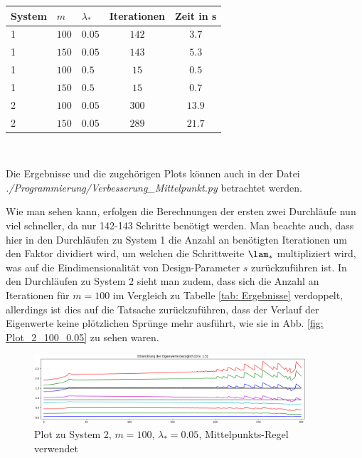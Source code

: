 \documentclass[a4paper,12pt]{report}
\newcommand{\1}{\mathds{1}}
\theoremstyle{plain} %
\theoremstyle{definition} %
\theoremstyle{remark}
\begin{document}
            \begin{table}[!ht]
                  \centering
                  \begin{tabular}{lllcc}
                       System & $m$ & $\lambda_*$ & Iterationen & Zeit in s\\
                       \hline
                       1 & $100$ & $0.05$ & $142$ & $3.7$ \\ 
                       1 & $150$ & $0.05$ & $143$ & $5.3$ \\
                       \hline
                       1 & $100$ & $0.5$ & $15$ & $0.5$ \\
                       1 & $150$ & $0.5$ & $15$ & $0.7$ \\
                       \hline
                       2 & $100$ & $0.05$ & $300$ & $13.9$ \\
                       2 & $150$ & $0.05$ & $289$ & $21.7$ \\
                       \hline
                  \end{tabular}\\
                  \label{tab: Ergebnisse_Mittelpunkt}
            \end{table}

            Die Ergebnisse und die zugehörigen Plots können auch in der Datei \textit{./Programmierung/Verbesserung\_Mittelpunkt.py} betrachtet werden.

            Wie man sehen kann, erfolgen die Berechnungen der ersten zwei Durchläufe nun viel schneller, da nur 142-143 Schritte benötigt werden.
            Man beachte auch, dass hier in den Durchläufen zu System 1 die Anzahl an benötigten Iterationen um den Faktor dividiert wird,
            um welchen die Schrittweite $\lam_*$ multipliziert wird, was auf die Eindimensionalität von Design-Parameter $s$ zurückzuführen ist.
            In den Durchläufen zu System 2 sieht man zudem, dass sich die Anzahl an Iterationen für $m=100$ im Vergleich zu Tabelle \ref{tab: Ergebnisse} verdoppelt,
            allerdings ist dies auf die Tatsache zurückzuführen, dass der Verlauf der Eigenwerte keine plötzlichen Sprünge mehr ausführt, wie sie in Abb. \ref{fig: Plot_2_100_0.05} zu sehen waren.

            \begin{figure}[h!t]
                  \centering
                  \includegraphics[width=0.9\textwidth, keepaspectratio]{./Mittelpunkt/Plot_2_100_0.05.png}
                  \caption[Plot zu System 2, $m=100$, $\lambda_*=0.05$, Mittelpunkts-Regel]{Plot zu System 2, $m=100$, $\lambda_*=0.05$, Mittelpunkts-Regel verwendet}
                  \label{fig: Plot_2_Mittelpunkt}
            \end{figure}
\end{document}
